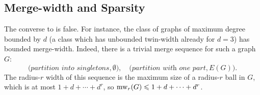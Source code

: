 
\subsection{Merge-width and Sparsity}\label{sec:sparsity}
The converse to  is false. 
For instance,  the class 
of graphs of maximum degree bounded by $d$ (a class which has unbounded twin-width already for $d=3$) 
has bounded merge-width.
Indeed, there is a trivial merge sequence for such a graph $G$: 
 $$\bigl(\textit{partition into singletons},\emptyset\bigr),\quad \bigl(\textit{partition with one part},E(G)\bigr).$$
The radius-$r$ width of this sequence is 
the maximum size of a radius-$r$ ball in $G$,
which is at most $1+d+\cdots+d^r$, 
so 
$\operatorname{mw}_r(G)\leqslant 1+d+\cdots+d^r$.



